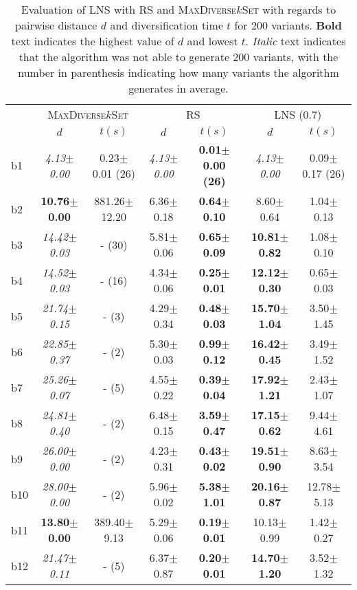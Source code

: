 \begin{longtable}{|l|c|c|c|c|c|c|}
\caption{\label{tab:dist_max_rs_lns} Evaluation of \ac{LNS} with \ac{RS} and \textsc{MaxDiverse$k$Set}
		with regards to pairwise distance $d$ and diversification time $t$ for 200 variants. \textbf{Bold} text indicates the highest value of $d$
		and lowest $t$. \textit{Italic} text indicates that the algorithm was not able to generate
		200 variants, with the number in parenthesis indicating how many variants the algorithm generates in average.}\\
\hline
&\multicolumn{2}{c|}{\textsc{MaxDiverse$k$Set}}&\multicolumn{2}{c|}{{RS}}&\multicolumn{2}{c|}{LNS (0.7)}\\
\cline{2-7}
&$d$&$t(s)$&$d$&$t(s)$&$d$&$t(s)$\\
\hline
b1&\textit{4.13$\pm$0.00} & 0.23$\pm$0.01 (26)&\textit{4.13$\pm$0.00} & \textbf{0.01$\pm$0.00 (26)}&\textit{4.13$\pm$0.00} & 0.09$\pm$0.17 (26)
\\
b2&\textbf{10.76$\pm$0.00} & 881.26$\pm$12.20&6.36$\pm$0.18 & \textbf{0.64$\pm$0.10}&8.60$\pm$0.64 & 1.04$\pm$0.13
\\
b3&\textit{14.42$\pm$0.03} & - (30)&5.81$\pm$0.06 & \textbf{0.65$\pm$0.09}&\textbf{10.81$\pm$0.82} & 1.08$\pm$0.10
\\
b4&\textit{14.52$\pm$0.03} & - (16)&4.34$\pm$0.06 & \textbf{0.25$\pm$0.01}&\textbf{12.12$\pm$0.30} & 0.65$\pm$0.03
\\
b5&\textit{21.74$\pm$0.15} & - (3)&4.29$\pm$0.34 & \textbf{0.48$\pm$0.03}&\textbf{15.70$\pm$1.04} & 3.50$\pm$1.45
\\
b6&\textit{22.85$\pm$0.37} & - (2)&5.30$\pm$0.03 & \textbf{0.99$\pm$0.12}&\textbf{16.42$\pm$0.45} & 3.49$\pm$1.52
\\
b7&\textit{25.26$\pm$0.07} & - (5)&4.55$\pm$0.22 & \textbf{0.39$\pm$0.04}&\textbf{17.92$\pm$1.21} & 2.43$\pm$1.07
\\
b8&\textit{24.81$\pm$0.40} & - (2)&6.48$\pm$0.15 & \textbf{3.59$\pm$0.47}&\textbf{17.15$\pm$0.62} & 9.44$\pm$4.61
\\
b9&\textit{26.00$\pm$0.00} & - (2)&4.23$\pm$0.31 & \textbf{0.43$\pm$0.02}&\textbf{19.51$\pm$0.90} & 8.63$\pm$3.54
\\
b10&\textit{28.00$\pm$0.00} & - (2)&5.96$\pm$0.02 & \textbf{5.38$\pm$1.01}&\textbf{20.16$\pm$0.87} & 12.78$\pm$5.13
\\
b11&\textbf{13.80$\pm$0.00} & 389.40$\pm$9.13&5.29$\pm$0.06 & \textbf{0.19$\pm$0.01}&10.13$\pm$0.99 & 1.42$\pm$0.27
\\
b12&\textit{21.47$\pm$0.11} & - (5)&6.37$\pm$0.87 & \textbf{0.20$\pm$0.01}&\textbf{14.70$\pm$1.20} & 3.52$\pm$1.32

\end{longtable}
